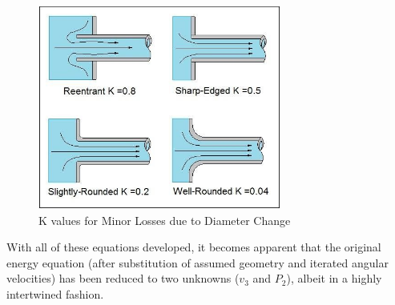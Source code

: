\documentclass{report}
\begin{document}
\begin{figure}[H]
\centering
\includegraphics[width=8cm]{"Nozzel Minor Losses"}
\caption{K values for Minor Losses due to Diameter Change}
\end{figure}
With all of these equations developed, it becomes apparent that the original energy equation (after substitution of assumed geometry and iterated angular velocities) has been reduced to two unknowns ($v_3$ and $P_2$), albeit in a highly intertwined fashion.
\end{document}

